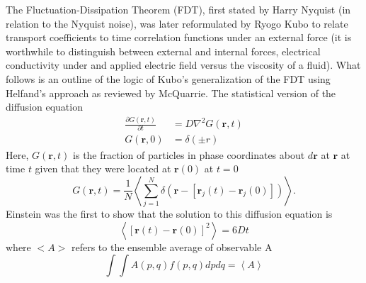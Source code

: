 The Fluctuation-Dissipation Theorem (FDT), first stated by Harry Nyquist (in relation to the Nyquist noise), was later reformulated by Ryogo Kubo to relate transport coefficients to time correlation functions \cite{JPSJ.12.570} under an external force (it is worthwhile to distinguish between external and internal forces, electrical conductivity under and applied electric field versus the viscosity of a fluid). \cite{} What follows is an outline of the logic of Kubo's generalization of the FDT using Helfand's approach as reviewed by McQuarrie\cite{mcquarrie}. The statistical version of the diffusion equation
%
\begin{equation}
\begin{split}
	\frac{\partial G(\bm{r},t)}{\partial t}&= D \nabla ^2G(\bm{r},t)\\
G(\bm{r},0)&=\delta(\pm{r})
\end{split}
\end{equation}
%
Here, $G(\bm{r},t)$ is the fraction of particles in phase coordinates about $d\bm{r}$ at $\bm{r}$ at time $t$ given that they were located at $\bm{r}(0)$ at $t=0$
%
\begin{equation}
G(\bm{r},t)= \frac{1}{N}\left<\sum_{j=1}^N\delta(\bm{r}-[\bm{r}_j(t)-\bm{r}_j(0)])\right>.
\end{equation}
%
Einstein was the first to show that the solution to this diffusion equation is
%
\begin{equation}
\left<[\bm{r}(t)-\bm{r}(0)]^2\right>=6Dt
\end{equation}
%
%
%
where $<A>$ refers to the ensemble average of observable A
\begin{equation}
\int \int A(p,q) f(p,q) dpdq=\left<A\right>
\end{equation}
